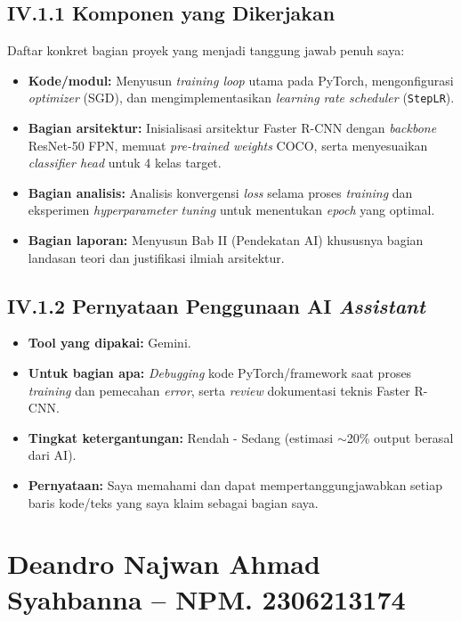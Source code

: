 \documentclass[11pt,a4paper,oneside]{report}
\begin{document}
\subsection*{IV.1.1 Komponen yang Dikerjakan}
Daftar konkret bagian proyek yang menjadi tanggung jawab penuh saya:
\begin{itemize}[leftmargin=*]
    \item \textbf{Kode/modul:} Menyusun \textit{training loop} utama pada PyTorch, mengonfigurasi \textit{optimizer} (SGD), dan mengimplementasikan \textit{learning rate scheduler} (\texttt{StepLR}).
    \item \textbf{Bagian arsitektur:} Inisialisasi arsitektur Faster R-CNN dengan \textit{backbone} ResNet-50 FPN, memuat \textit{pre-trained weights} COCO, serta menyesuaikan \textit{classifier head} untuk 4 kelas target.
    \item \textbf{Bagian analisis:} Analisis konvergensi \textit{loss} selama proses \textit{training} dan eksperimen \textit{hyperparameter tuning} untuk menentukan \textit{epoch} yang optimal.
    \item \textbf{Bagian laporan:} Menyusun Bab II (Pendekatan AI) khususnya bagian landasan teori dan justifikasi ilmiah arsitektur.
\end{itemize}

\subsection*{IV.1.2 Pernyataan Penggunaan AI \textit{Assistant}}
\begin{itemize}[leftmargin=*]
    \item \textbf{Tool yang dipakai:} Gemini.
    \item \textbf{Untuk bagian apa:} \textit{Debugging} kode PyTorch/framework saat proses \textit{training} dan pemecahan \textit{error}, serta \textit{review} dokumentasi teknis Faster R-CNN.
    \item \textbf{Tingkat ketergantungan:} Rendah - Sedang (estimasi $\sim$20\% output berasal dari AI).
    \item \textbf{Pernyataan:} Saya memahami dan dapat mempertanggungjawabkan setiap baris kode/teks yang saya klaim sebagai bagian saya.
\end{itemize}

\section{Deandro Najwan Ahmad Syahbanna -- NPM. 2306213174}
\end{document}
